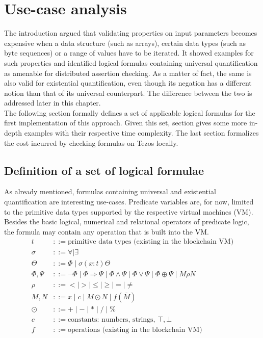 \chapter{Use-case analysis}\label{chap:use_cases}
The introduction argued that validating properties on input parameters becomes expensive when a data structure (such as arrays), certain data types (such as byte sequences) or a range of values have to be iterated. It showed examples for such properties and identified logical formulas containing universal quantification as amenable for distributed assertion checking. As a matter of fact, the same is also valid for existential quantification, even though its negation has a different notion than that of its universal counterpart. The difference between the two is addressed later in this chapter. \\
The following section formally defines a set of applicable logical formulas for the first implementation of this approach. Given this set, section  gives some more in-depth examples with their respective time complexity. The last section formalizes the cost incurred by checking formulas on Tezos locally. 

\section{Definition of a set of logical formulae}\label{sec:formulae}
As already mentioned, formulas containing universal and existential quantification are interesting use-cases. Predicate variables are, for now, limited to the primitive data types supported by the respective virtual machines (VM). Besides the basic logical, numerical and relational operators of predicate logic, the formula may contain any operation that is built into the VM.
\begin{align*}
    t &::= \text{primitive data types (existing in the blockchain VM)} \\
    \sigma &::= \forall \mid \exists \\
    \Theta &::= \Phi \mid \sigma (x:t) \Theta \\
    \Phi,\Psi &::= \neg\Phi \mid \Phi \Rightarrow \Psi \mid \Phi\wedge\Psi \mid
    				\Phi\vee\Psi \mid \Phi \oplus \Psi \mid M \rho N \\
    \rho &::= < \mid > \mid \le \mid \ge \mid = \mid \ne \\
    M, N &::= x \mid c \mid M \odot N  \mid f (\overline M) \\
    \odot &::= +\mid -\mid * \mid / \mid \% \\
    c &::= \text{constants: numbers, strings, } \top, \bot \\
    f &::= \text{operations (existing in the blockchain VM)}
\end{align*}
\begingroup\vspace*{-\baselineskip}
\vspace*{\baselineskip}\endgroup

